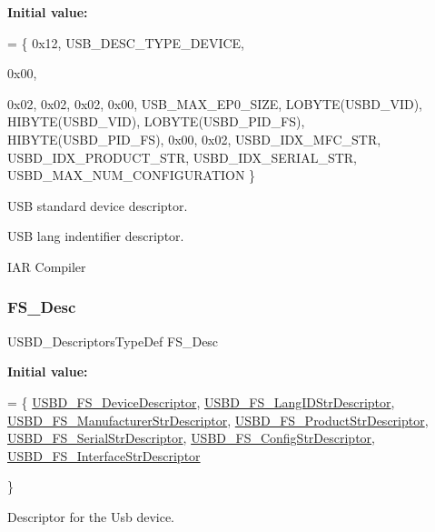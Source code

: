 {\bfseries Initial value\+:}
\begin{DoxyCode}
=
    \{
        0x12,                 
        USB\_DESC\_TYPE\_DEVICE, 





        0x00, 

        0x02,
        0x02,                
        0x02,                
        0x00,                
        USB\_MAX\_EP0\_SIZE,    
        LOBYTE(USBD\_VID),    
        HIBYTE(USBD\_VID),    
        LOBYTE(USBD\_PID\_FS), 
        HIBYTE(USBD\_PID\_FS), 
        0x00,                
        0x02,
        USBD\_IDX\_MFC\_STR,          
        USBD\_IDX\_PRODUCT\_STR,      
        USBD\_IDX\_SERIAL\_STR,       
        USBD\_MAX\_NUM\_CONFIGURATION 
\}
\end{DoxyCode}
U\+SB standard device descriptor.

U\+SB lang indentifier descriptor.

I\+AR Compiler \mbox{\label{group__USBD__DESC__Private__Variables_gae36d67393118d9d8531a8d633e23a797}} 
\subsubsection{\texorpdfstring{F\+S\+\_\+\+Desc}{FS\_Desc}}
{\footnotesize\ttfamily U\+S\+B\+D\+\_\+\+Descriptors\+Type\+Def F\+S\+\_\+\+Desc}

{\bfseries Initial value\+:}
\begin{DoxyCode}
=
    \{
        \hyperlink{group__USBD__DESC__Private__Functions_ga14798be38c08a37163e53167032485ff}{USBD\_FS\_DeviceDescriptor}, 
      \hyperlink{group__USBD__DESC__Private__Functions_gac02628ceb6a6a071e192dcb85063c0cc}{USBD\_FS\_LangIDStrDescriptor}, 
      \hyperlink{group__USBD__DESC__Private__Functions_ga6427a671827813efe1a46c3dfcb05683}{USBD\_FS\_ManufacturerStrDescriptor},
        \hyperlink{group__USBD__DESC__Private__Functions_ga0ec558c0303daabb851d584109a56514}{USBD\_FS\_ProductStrDescriptor}, 
      \hyperlink{group__USBD__DESC__Private__Functions_gaad2a1d1451821845eda602a82b1cd213}{USBD\_FS\_SerialStrDescriptor}, 
      \hyperlink{group__USBD__DESC__Private__Functions_ga40ed2a0fb60c50a285983a09ba6921d6}{USBD\_FS\_ConfigStrDescriptor},
        \hyperlink{group__USBD__DESC__Private__Functions_gab248f43276f92d982ab5853111e4fb10}{USBD\_FS\_InterfaceStrDescriptor}



 
\}
\end{DoxyCode}
Descriptor for the Usb device. 